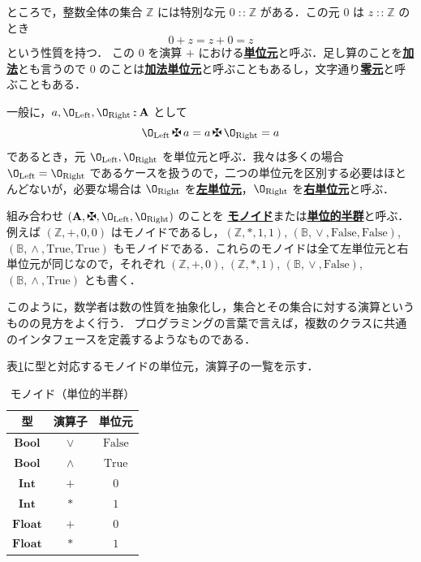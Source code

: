 \documentclass[a4paper,twocolumn]{jsbook}
\newcommand{\keyword}[1]{{\underline{\textbf{#1}}}}
\newcommand{\mSpecialConstant}[1]{\textrm{#1}} %
\newcommand{\mFalse}{\mSpecialConstant{False}}
\newcommand{\mTrue}{\mSpecialConstant{True}}
\newcommand{\mZero}{\O}
\DeclareMathOperator{\mIn}{{:\!:}}
\DeclareMathOperator{\mLogicalAnd}{\wedge}
\DeclareMathOperator{\mLogicalOr}{\vee}
\DeclareMathOperator{\mPlus}{\maltese}
\newcommand{\mSpecialSub}[1]{\text{#1}}
\newcommand{\mLeft}{\mSpecialSub{Left}}
\newcommand{\mRight}{\mSpecialSub{Right}}
\newcommand{\mSet}[1]{\mathbf{#1}}
\newcommand{\mSpecialSet}[1]{\mathbb{#1}} %
\newcommand{\mBSet}{\mSpecialSet{B}}
\newcommand{\mZSet}{\mSpecialSet{Z}}
\newcommand{\mType}[1]{\mathbf{#1}}
\newcommand{\mBoolType}{\mType{Bool}}
\newcommand{\mFloatType}{\mType{Float}}
\newcommand{\mIntType}{\mType{Int}}
\newcommand{\mTupleWith}[1]{\left(#1\right)}
\begin{document}
ところで，整数全体の集合 $\mZSet$ には特別な元 $0\mIn\mZSet$ がある．この元 $0$ は $z\mIn\mZSet$ のとき
\begin{equation}
0+z=z+0=z
\end{equation}
という性質を持つ．
この $0$ を演算 $+$ における\keyword{単位元}と呼ぶ．足し算のことを\keyword{加法}とも言うので $0$ のことは\keyword{加法単位元}と呼ぶこともあるし，文字通り\keyword{零元}と呼ぶこともある．

一般に，$a,\mZero_\mLeft,\mZero_\mRight\mIn\mSet{A}$ として
\begin{equation}
\label{eq:identity}
\mZero_\mLeft\mPlus a=a\mPlus\mZero_\mRight=a
\end{equation}
であるとき，元 $\mZero_\mLeft,\mZero_\mRight$ を単位元と呼ぶ．我々は多くの場合 $\mZero_\mLeft=\mZero_\mRight$ であるケースを扱うので，二つの単位元を区別する必要はほとんどないが，必要な場合は $\mZero_\mRight$ を\keyword{左単位元}，$\mZero_\mRight$ を\keyword{右単位元}と呼ぶ．

組み合わせ $\mTupleWith{\mSet{A},\mPlus,\mZero_\mLeft,\mZero_\mRight}$ のことを
\keyword{モノイド}または\keyword{単位的半群}と呼ぶ．例えば $\mTupleWith{\mZSet,+,0,0}$ はモノイドであるし，$\mTupleWith{\mZSet,*,1,1}$, $\mTupleWith{\mBSet,\mLogicalOr,\mFalse,\mFalse}$, $\mTupleWith{\mBSet,\mLogicalAnd,\mTrue,\mTrue}$ もモノイドである．これらのモノイドは全て左単位元と右単位元が同じなので，それぞれ $\mTupleWith{\mZSet,+,0}$, $\mTupleWith{\mZSet,*,1}$, $\mTupleWith{\mBSet,\mLogicalOr,\mFalse}$, $\mTupleWith{\mBSet,\mLogicalAnd,\mTrue}$ とも書く．

このように，数学者は数の性質を抽象化し，集合とその集合に対する演算というものの見方をよく行う．
プログラミングの言葉で言えば，複数のクラスに共通のインタフェースを定義するようなものである．

表\ref{tab:monoids}に型と対応するモノイドの単位元，演算子の一覧を示す．

\begin{table}
\caption{モノイド（単位的半群）}
\label{tab:monoids}
\begin{center}
\begin{tabular}{||c||c|c||}
\hline
型
    &演算子
    &単位元\\
\hline\hline
$\mBoolType$
    &$\vee$
    &$\mFalse$\\
\hline
$\mBoolType$
    &$\wedge$
    &$\mTrue$\\
\hline
$\mIntType$
    &$+$
    &$0$\\
\hline
$\mIntType$
    &$*$
    &$1$\\
\hline
$\mFloatType$
    &$+$
    &$0$\\
\hline
$\mFloatType$
    &$*$
    &$1$\\
\hline
\end{tabular}
\end{center}
\end{table}
\end{document}
